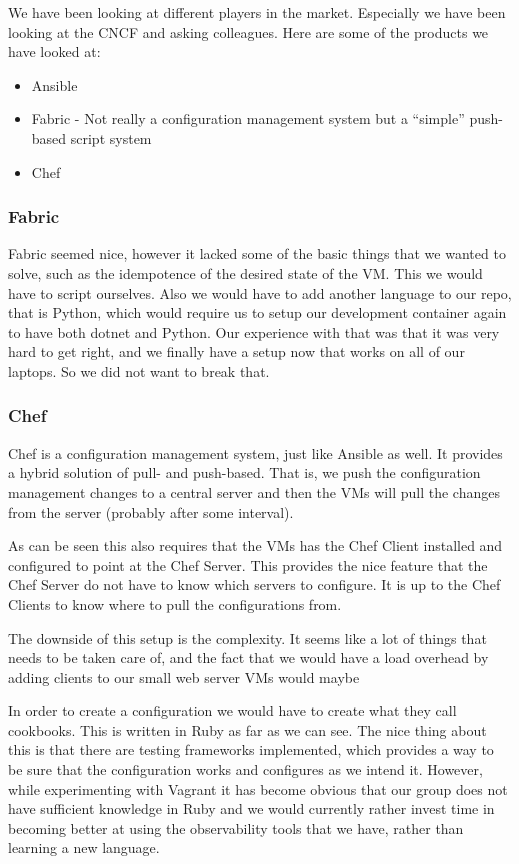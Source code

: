We have been looking at different players in the market. Especially we have been looking at the CNCF and asking colleagues. Here are some of the products we have looked at:

\begin{itemize}
    \item Ansible
    \item Fabric - Not really a configuration management system but a “simple” push-based script system
    \item Chef
\end{itemize}

\subsubsection{Fabric}

Fabric seemed nice, however it lacked some of the basic things that we wanted to solve, such as the idempotence of the desired state of the VM. This we would have to script ourselves. Also we would have to add another language to our repo, that is Python, which would require us to setup our development container again to have both dotnet and Python. Our experience with that was that it was very hard to get right, and we finally have a setup now that works on all of our laptops. So we did not want to break that.

\subsubsection{Chef}

Chef is a configuration management system, just like Ansible as well. It provides a hybrid solution of pull- and push-based. That is, we push the configuration management changes to a central server and then the VMs will pull the changes from the server (probably after some interval).

As can be seen this also requires that the VMs has the Chef Client installed and configured to point at the Chef Server. This provides the nice feature that the Chef Server do not have to know which servers to configure. It is up to the Chef Clients to know where to pull the configurations from.

The downside of this setup is the complexity. It seems like a lot of things that needs to be taken care of, and the fact that we would have a load overhead by adding clients to our small web server VMs would maybe

In order to create a configuration we would have to create what they call cookbooks. This is written in Ruby as far as we can see. The nice thing about this is that there are testing frameworks implemented, which provides a way to be sure that the configuration works and configures as we intend it. However, while experimenting with Vagrant it has become obvious that our group does not have sufficient knowledge in Ruby and we would currently rather invest time in becoming better at using the observability tools that we have, rather than learning a new language.

